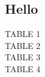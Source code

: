 \documentclass{article}
\date{17 May 2035}
\begin{document}
\begin{center}
\section{Hello}
\scriptsize

TABLE 1\\

\break
\break
\break
TABLE 2\\

\break
\break
\break
TABLE 3\\

\break
\break
\break
TABLE 4\\



\end{center}
\end{document}
